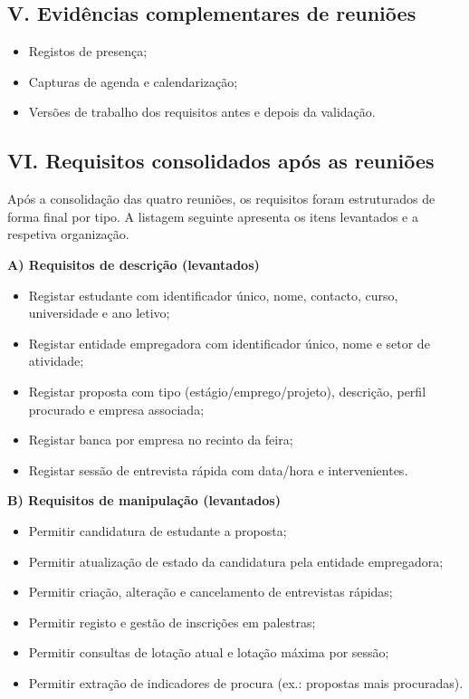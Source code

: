 \documentclass[12pt,a4paper]{article}
\begin{document}
\newpage
{}
\subsection*{V. Evidências complementares de reuniões}

\begin{itemize}[leftmargin=1.5cm]
    \item Registos de presença;
    \item Capturas de agenda e calendarização;
    \item Versões de trabalho dos requisitos antes e depois da validação.
\end{itemize}

\newpage
{}
\subsection*{VI. Requisitos consolidados após as reuniões}

Após a consolidação das quatro reuniões, os requisitos foram estruturados de
forma final por tipo. A listagem seguinte apresenta os itens levantados e a
respetiva organização.

\textbf{A) Requisitos de descrição (levantados)}
\begin{itemize}[leftmargin=1.5cm]
    \item Registar estudante com identificador único, nome, contacto, curso,
    universidade e ano letivo;
    \item Registar entidade empregadora com identificador único, nome e setor de
    atividade;
    \item Registar proposta com tipo (estágio/emprego/projeto), descrição,
    perfil procurado e empresa associada;
    \item Registar banca por empresa no recinto da feira;
    \item Registar sessão de entrevista rápida com data/hora e intervenientes.
\end{itemize}

\textbf{B) Requisitos de manipulação (levantados)}
\begin{itemize}[leftmargin=1.5cm]
    \item Permitir candidatura de estudante a proposta;
    \item Permitir atualização de estado da candidatura pela entidade
    empregadora;
    \item Permitir criação, alteração e cancelamento de entrevistas rápidas;
    \item Permitir registo e gestão de inscrições em palestras;
    \item Permitir consultas de lotação atual e lotação máxima por sessão;
    \item Permitir extração de indicadores de procura (ex.: propostas mais
    procuradas).
\end{itemize}
\end{document}
